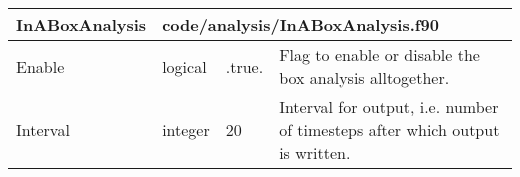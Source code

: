 \documentclass{article}
\begin{document}
\begin{longtable}{llll}
\toprule
\textbf{\large{InABoxAnalysis}} & \multicolumn{3}{l}{\footnotesize{code/analysis/InABoxAnalysis.f90}}\\*
\midrule
\endfirsthead
\midrule
\endhead
Enable & \begin{minipage}[t]{2cm}logical\end{minipage} & \begin{minipage}[t]{2cm}.true.\end{minipage} & \begin{minipage}[t]{12cm}Flag to enable or disable the box analysis alltogether.\end{minipage}\\*
\midrule
Interval & \begin{minipage}[t]{2cm}integer\end{minipage} & \begin{minipage}[t]{2cm}20\end{minipage} & \begin{minipage}[t]{12cm}Interval for output, i.e. number of timesteps after which output is written.\end{minipage}\\*
\bottomrule
\end{longtable}
{ }



\end{document}
